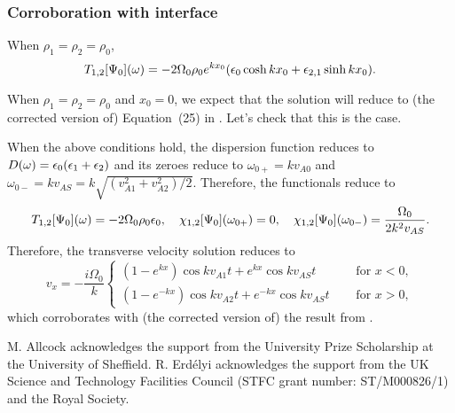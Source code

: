 \documentclass{aastex61}
\begin{document}
\subsubsection{Corroboration with interface}
When $\rho_1 = \rho_2 = \rho_0$,
\begin{equation}
T_{1,2}[\Psi_0](\omega) = -2\Omega_0\rho_0 e^{kx_0} (\e_0 \cosh{kx_0} + \e_{2,1}\sinh{kx_0}).
\end{equation}

When $\rho_1 = \rho_2 = \rho_0$ and $x_0 = 0$, we expect that the solution will reduce to (the corrected version of) Equation~(25) in \cite{rae_etal81}. Let's check that this is the case.

When the above conditions hold, the dispersion function reduces to $D(\omega) = \epsilon_0(\epsilon_1 + \epsilon_2)$ and its zeroes reduce to $\omega_{0+} = kv_{A0}$ and $\omega_{0-} = kv_{AS} = k \sqrt{(v_{A1}^2 + v_{A2}^2) / 2}$. Therefore, the functionals reduce to
\begin{equation}
T_{1,2}[\Psi_0](\omega) = -2\Omega_0\rho_0 \e_0,
\quad 
\chi_{1,2}[\Psi_0](\omega_{0+}) = 0,
\quad
\chi_{1,2}[\Psi_0](\omega_{0-}) = \frac{\Omega_0}{2k^2v_{AS}}.
\end{equation}
Therefore, the transverse velocity solution reduces to
\begin{equation}
v_x = -\frac{i\Omega_0}{k} 
\begin{cases}
(1 - e^{kx})\cos{kv_{A1}t} + e^{kx}\cos{kv_{AS}t} \quad &\text{ for } x < 0, \\
(1 - e^{-kx})\cos{kv_{A2}t} + e^{-kx}\cos{kv_{AS}t} \quad &\text{ for } x > 0,
\end{cases}
\end{equation}
which corroborates with (the corrected version of) the result from \cite{rae_etal81}.


\acknowledgments
M. Allcock acknowledges the support from the University Prize Scholarship at the University of Sheffield. R. Erd\'{e}lyi acknowledges the support from the UK Science and Technology Facilities Council (STFC grant number: ST/M000826/1) and the Royal Society. 


\appendix
\end{document}
